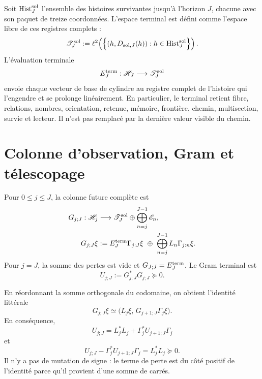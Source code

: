 Soit \(\operatorname{Hist}_{J}^{\rm sol}\) l'ensemble des histoires
survivantes jusqu'à l'horizon \(J\), chacune avec son paquet de treize
coordonnées. L'espace terminal est défini comme l'espace libre de ces
registres complets :
\begin{equation}\label{eq:pdfv2-sol-terminal-space}
 \mathscr T_J^{\rm sol}
 :=\ell^2\!\left(
 \left\{(h,D_{{\rm sol},J}(h)):
 h\in\operatorname{Hist}_{J}^{\rm sol}\right\}
 \right).
\end{equation}
L'évaluation terminale
\begin{equation}\label{eq:pdfv2-sol-terminal-evaluation}
 E_J^{\rm term}:\mathscr H_J\longrightarrow\mathscr T_J^{\rm sol}
\end{equation}
envoie chaque vecteur de base de cylindre au registre complet de l'histoire qui
l'engendre et se prolonge linéairement. En particulier, le terminal retient
fibre, relations, nombres, orientation, retenue, mémoire, frontière, chemin,
multisection, survie et lecteur. Il n'est pas remplacé par la dernière valeur
visible du chemin.

\section{Colonne d'observation, Gram et télescopage}
\label{sec:pdfv2-sol-gram}

Pour \(0\leq j\leq J\), la colonne future complète est
\begin{equation}\label{eq:pdfv2-sol-g-column}
 \begin{aligned}
 G_{j;J}:\mathscr H_j&\longrightarrow
 \mathscr T_J^{\rm sol}\oplus
 \bigoplus_{n=j}^{J-1}\mathscr E_n,\\
 G_{j;J}\xi
 &:={}
 E_J^{\rm term}\Gamma_{j:J}\xi
 \ \oplus\ 
 \bigoplus_{n=j}^{J-1}L_n\Gamma_{j:n}\xi.
 \end{aligned}
\end{equation}
Pour \(j=J\), la somme des pertes est vide et
\(G_{J;J}=E_J^{\rm term}\). Le Gram terminal est
\begin{equation}\label{eq:pdfv2-sol-u-gram}
 U_{j;J}:=G_{j;J}^*G_{j;J}\succeq0.
\end{equation}

En réordonnant la somme orthogonale du codomaine, on obtient l'identité littérale
\begin{equation}\label{eq:pdfv2-sol-g-recursion}
 G_{j;J}\xi
 \simeq
 \bigl(L_j\xi,\,G_{j+1;J}\Gamma_j\xi\bigr).
\end{equation}
En conséquence,
\begin{equation}\label{eq:pdfv2-sol-stein}
 \boxed{U_{j;J}
 =L_j^*L_j+\Gamma_j^*U_{j+1;J}\Gamma_j}
\end{equation}
et
\begin{equation}\label{eq:pdfv2-sol-stein-difference}
 U_{j;J}-\Gamma_j^*U_{j+1;J}\Gamma_j
 =L_j^*L_j\succeq0.
\end{equation}
Il n'y a pas de mutation de signe : le terme de perte est du côté positif
de l'identité parce qu'il provient d'une somme de carrés.

